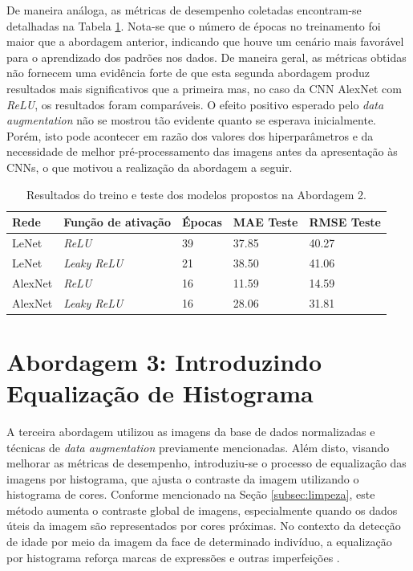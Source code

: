 	De maneira análoga, as métricas de desempenho coletadas encontram-se detalhadas na Tabela \ref{tab:results2}. Nota-se que o número de épocas no treinamento foi maior que a abordagem anterior, indicando que houve um cenário mais favorável para o aprendizado dos padrões nos dados. De maneira geral, as métricas obtidas não fornecem uma evidência forte de que esta segunda abordagem produz resultados mais significativos que a primeira mas, no caso da CNN AlexNet com \emph{ReLU}, os resultados foram comparáveis. O efeito positivo esperado pelo \emph{data augmentation} não se mostrou tão evidente quanto se esperava inicialmente. Porém, isto pode acontecer em razão dos valores dos hiperparâmetros e da necessidade de melhor pré-processamento das imagens antes da apresentação às CNNs, o que motivou a realização da abordagem a seguir.

	\begin{table}[!hb]
		\caption{Resultados do treino e teste dos modelos propostos na Abordagem 2.}
		\label{tab:results2}
		\begin{center}
			\begin{tabular}{l l l l l}
				\toprule
				Rede & Função de ativação & Épocas & MAE Teste & RMSE Teste \\
				\midrule
				LeNet & \emph{ReLU}  & 39 & 37.85 & 40.27 \\
				LeNet & \emph{Leaky ReLU} & 21 & 38.50 & 41.06 \\
				AlexNet & \emph{ReLU}  & 16 & 11.59 & 14.59 \\
				AlexNet & \emph{Leaky ReLU} & 16 & 28.06 & 31.81 \\
				\bottomrule
			\end{tabular}
		\end{center}
	\end{table}



\section{Abordagem 3: Introduzindo Equalização de Histograma}%
	A terceira abordagem utilizou as imagens da base de dados normalizadas e técnicas de \emph{data augmentation} previamente mencionadas. Além disto, visando melhorar as métricas de desempenho, introduziu-se o processo de equalização das imagens por histograma, que ajusta o contraste da imagem utilizando o histograma de cores. Conforme mencionado na Seção \ref{subsec:limpeza}, este método aumenta o contraste global de imagens, especialmente quando os dados úteis da imagem são representados por cores próximas. No contexto da detecção de idade por meio da imagem da face de determinado indivíduo, a equalização por histograma reforça marcas de expressões e outras imperfeições \cite{acharya2005image}.

